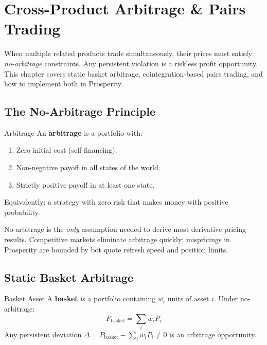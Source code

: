 \documentclass[12pt,a4paper,openany]{report}
\theoremstyle{definition}
\begin{document}

\chapter{Cross-Product Arbitrage \& Pairs Trading}

When multiple related products trade simultaneously, their prices must satisfy \emph{no-arbitrage} constraints. Any persistent violation is a riskless profit opportunity. This chapter covers static basket arbitrage, cointegration-based pairs trading, and how to implement both in Prosperity.

\section{The No-Arbitrage Principle}

\begin{definitionbox}{Arbitrage}
An \textbf{arbitrage} is a portfolio with:
\begin{enumerate}[label=\arabic*.]
  \item Zero initial cost (self-financing).
  \item Non-negative payoff in all states of the world.
  \item Strictly positive payoff in at least one state.
\end{enumerate}
Equivalently: a strategy with zero risk that makes money with positive probability.
\end{definitionbox}

No-arbitrage is the \emph{only} assumption needed to derive most derivative pricing results. Competitive markets eliminate arbitrage quickly; mispricings in Prosperity are bounded by bot quote refresh speed and position limits.

\section{Static Basket Arbitrage}

\begin{definitionbox}{Basket Asset}
A \textbf{basket} is a portfolio containing $w_i$ units of asset $i$. Under no-arbitrage:
\[
  P_{\text{basket}} = \sum_{i} w_i P_i
\]
Any persistent deviation $\Delta = P_{\text{basket}} - \sum_i w_i P_i \ne 0$ is an arbitrage opportunity.
\end{definitionbox}
\end{document}
